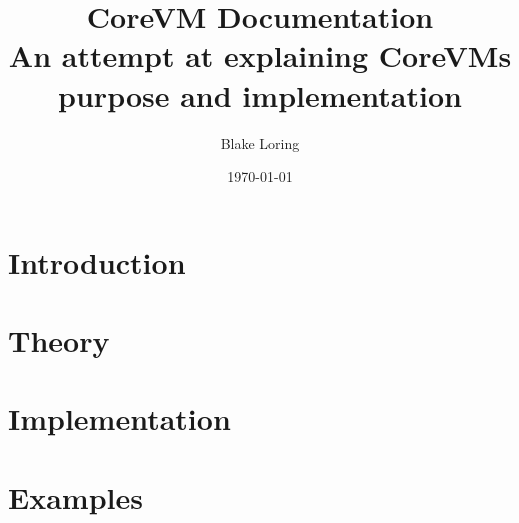 \documentclass{report}
\begin{document}
\title{CoreVM Documentation \\ \large An attempt at explaining CoreVMs purpose and implementation}
\author{Blake Loring}
\date{\today}

\maketitle

\chapter {Introduction}
\chapter {Theory}
\chapter {Implementation}
\chapter {Examples}
\end{document}
